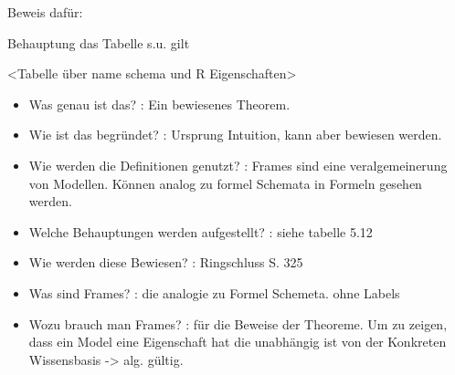 Beweis dafür:

Behauptung das Tabelle s.u. gilt

<Tabelle über name schema und R Eigenschaften>











\begin{itemize}
	\item Was genau ist das? : Ein bewiesenes Theorem.
	\item Wie ist das begründet? : Ursprung Intuition, kann aber bewiesen werden.
	\item Wie werden die Definitionen genutzt? : Frames sind eine veralgemeinerung von Modellen. Können analog zu formel Schemata in Formeln gesehen werden.
	\item Welche Behauptungen werden aufgestellt? : siehe tabelle 5.12
	\item Wie werden diese Bewiesen? : Ringschluss S. 325
	\item Was sind Frames? : die analogie zu Formel Schemeta. \KM ohne Labels
	\item Wozu brauch man Frames? : für die Beweise der Theoreme. Um zu zeigen, dass ein Model eine Eigenschaft hat die unabhängig ist von der Konkreten Wissensbasis -> alg. gültig.
\end{itemize}













